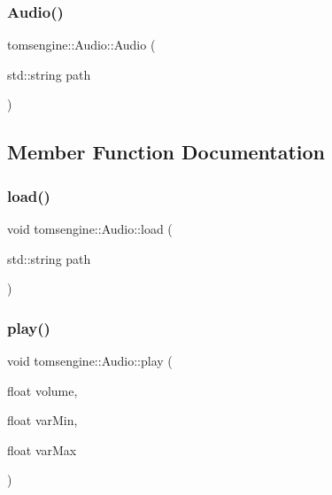\mbox{\label{classtomsengine_1_1_audio_ab653e551f2f665a7bd15b430166d6d36}} 
\subsubsection{\texorpdfstring{Audio()}{Audio()}\hspace{0.1cm}{\footnotesize\ttfamily [2/2]}}
{\footnotesize\ttfamily tomsengine\+::\+Audio\+::\+Audio (\begin{DoxyParamCaption}\item[{std\+::string}]{path }\end{DoxyParamCaption})}



\subsection{Member Function Documentation}
\mbox{\label{classtomsengine_1_1_audio_ad8d728ef8d09ace872af3d7a441eb8f1}} 
\subsubsection{\texorpdfstring{load()}{load()}}
{\footnotesize\ttfamily void tomsengine\+::\+Audio\+::load (\begin{DoxyParamCaption}\item[{std\+::string}]{path }\end{DoxyParamCaption})}

\mbox{\label{classtomsengine_1_1_audio_a7ee76d0a8c6e9031f426eb61a157fccc}} 
\subsubsection{\texorpdfstring{play()}{play()}\hspace{0.1cm}{\footnotesize\ttfamily [1/2]}}
{\footnotesize\ttfamily void tomsengine\+::\+Audio\+::play (\begin{DoxyParamCaption}\item[{float}]{volume,  }\item[{float}]{var\+Min,  }\item[{float}]{var\+Max }\end{DoxyParamCaption})}

